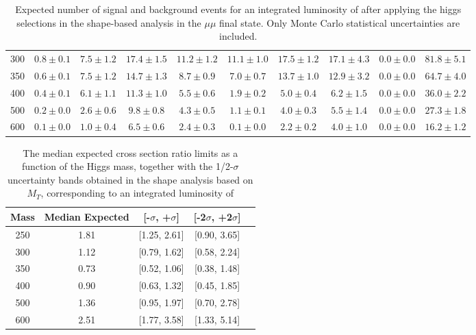 \begin{table}
{\begin{center}
\begin{tabular}{l | c c |  c c c c c c c }
300 & $0.8\pm0.1$ & $7.5\pm1.2$ & $17.4\pm1.5$ & $11.2\pm1.2$ & $11.1\pm1.0$ & $17.5\pm1.2$ & $17.1\pm4.3$ & $0.0\pm0.0$ & $81.8\pm5.1$ \\ %
350 & $0.6\pm0.1$ & $7.5\pm1.2$ & $14.7\pm1.3$ & $8.7\pm0.9$ & $7.0\pm0.7$ & $13.7\pm1.0$ & $12.9\pm3.2$ & $0.0\pm0.0$ & $64.7\pm4.0$ \\ %
400 & $0.4\pm0.1$ & $6.1\pm1.1$ & $11.3\pm1.0$ & $5.5\pm0.6$ & $1.9\pm0.2$ & $5.0\pm0.4$ & $6.2\pm1.5$ & $0.0\pm0.0$ & $36.0\pm2.2$ \\ %
500 & $0.2\pm0.0$ & $2.6\pm0.6$ & $9.8\pm0.8$ & $4.3\pm0.5$ & $1.1\pm0.1$ & $4.0\pm0.3$ & $5.5\pm1.4$ & $0.0\pm0.0$ & $27.3\pm1.8$ \\ %
600 & $0.1\pm0.0$ & $1.0\pm0.4$ & $6.5\pm0.6$ & $2.4\pm0.3$ & $0.1\pm0.0$ & $2.2\pm0.2$ & $4.0\pm1.0$ & $0.0\pm0.0$ & $16.2\pm1.2$ \\ %
\hline
\end{tabular}
\end{center}
}
\caption{Expected number of signal and background events for an 
  integrated luminosity of \intlumi after applying the higgs selections in the shape-based analysis in the $\mu\mu$ final state. 
  Only Monte Carlo statistical uncertainties are included. }
\label{tab:yield_shapebased_mm}
\end{table}

\begin{table}
\begin{center}
\begin{tabular}{ccccc}
\hline
 Mass & Median Expected & [-$\sigma$, +$\sigma$] & [-2$\sigma$, +2$\sigma$]\\\hline
 250 & 1.81 & [1.25, 2.61] & [0.90, 3.65] \\
300 & 1.12 & [0.79, 1.62] & [0.58, 2.24] \\
350 & 0.73 & [0.52, 1.06] & [0.38, 1.48] \\
400 & 0.90 & [0.63, 1.32] & [0.45, 1.85] \\
500 & 1.36 & [0.95, 1.97] & [0.70, 2.78] \\
600 & 2.51 & [1.77, 3.58] & [1.33, 5.14] \\
\hline
\end{tabular}
\end{center}
\label{tab:limits_mtshape_2fb}
\caption{\fixme The median expected cross section ratio limits as a function 
of the Higgs mass, together with the 1/2-$\sigma$ uncertainty bands obtained in the shape analysis based on $M_T$, corresponding to 
an integrated luminosity of \intlumi}
\end{table}
